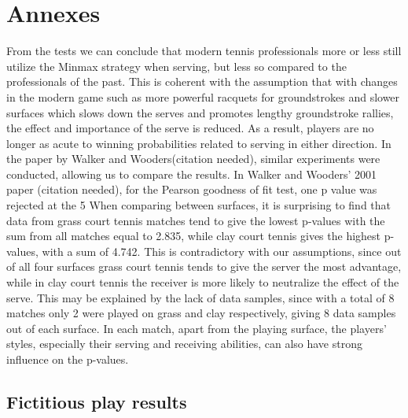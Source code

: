 \documentclass[11pt]{article}
\begin{document}
\section{Annexes}
From the tests we can conclude that modern tennis professionals more or less still utilize the Minmax strategy when serving, but less so compared to the professionals of the past. This is coherent with the assumption that with changes in the modern game such as more powerful racquets for groundstrokes and slower surfaces which slows down the serves and promotes lengthy groundstroke rallies, the effect and importance of the serve is reduced. As a result, players are no longer as acute to winning probabilities related to serving in either direction. In the paper by Walker and Wooders(citation needed), similar experiments were conducted, allowing us to compare the results.  In Walker and Wooders’ 2001 paper (citation needed), for the Pearson goodness of fit test, one p value was rejected at the 5%
When comparing between surfaces, it is surprising to find that data from grass court tennis matches tend to give the lowest p-values with the sum from all matches equal to 2.835, while clay court tennis gives the highest p-values, with a sum of 4.742. This is contradictory with our assumptions, since out of all four surfaces grass court tennis tends to give the server the most advantage, while in clay court tennis the receiver is more likely to neutralize the effect of the serve. This may be explained by the lack of data samples, since with a total of 8 matches only 2 were played on grass and clay respectively, giving 8 data samples out of each surface. In each match, apart from the playing surface, the players’ styles, especially their serving and receiving abilities, can also have strong influence on the p-values.

\subsection{Fictitious play results}
\label{sec:fic}



{}

\end{document}
